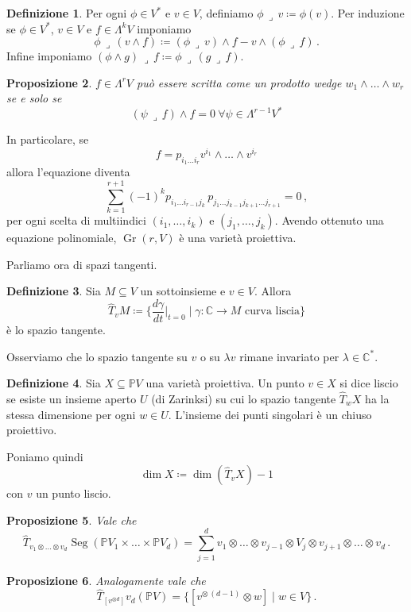 \documentclass[a4paper, 11pt]{article}
\theoremstyle{definition}
\newtheorem{Def}{Definizione}[section]
\theoremstyle{plain}
\newtheorem{Prop}[Def]{Proposizione}
\newcommand{\PP}{\mathbb{P}}
\newcommand{\C}{\mathbb{C}}
\newcommand{\deff}{\coloneqq}
\DeclareMathOperator{\Gr}{Gr}
\DeclareMathOperator{\Seg}{Seg}
\begin{document}
\begin{Def}
	Per ogni $\phi \in V^\ast$ e $v \in V$, definiamo $\phi \,\lrcorner \,v \deff \phi(v)$. Per induzione se $\phi \in V^\ast$, $v \in V$ e $f \in \Lambda^k V$ imponiamo
	\[
		\phi\,\lrcorner\,(v \wedge f) \deff (\phi \,\lrcorner\, v) \wedge f - v \wedge (\phi \,\lrcorner\, f)\,.
	\]
	Infine imponiamo $(\phi \wedge g)\,\lrcorner\, f \deff \phi\,\lrcorner\,(g\, \lrcorner\, f)$.
\end{Def}
\begin{Prop}
	$f \in \Lambda^r V$ può essere scritta come un prodotto wedge $w_1 \wedge\dots\wedge w_r$ se e solo se 
	\[
		(\psi \,\lrcorner\,f) \wedge f = 0\ \forall \psi \in \Lambda^{r-1}V^*
	\]
\end{Prop}
In particolare, se 
\[
	f = p_{i_1\dots i_r}v^{i_1} \wedge \dots \wedge v^{i_r}
\] 
allora l'equazione diventa
\[
	\sum_{k=1}^{r+1}(-1)^kp_{i_1\dots i_{r-1}j_k}\,p_{j_1\dots j_{k-1}j_{k+1}\dots j_{r+1}} = 0\,,
\]
per ogni scelta di multiindici $(i_1, \dots, i_k)$ e $(j_1, \dots, j_k)$. Avendo ottenuto una equazione polinomiale, $\Gr(r,V)$ è una varietà proiettiva.

Parliamo ora di spazi tangenti. 
\begin{Def}
	Sia $M \subseteq V$ un sottoinsieme e $v \in V$. Allora
	\[
		\hat{T}_vM \deff \Big\{\frac{d\gamma}{dt}\Big|_{t = 0} \mid \gamma \colon \C \to M \text{ curva liscia}\Big\}
	\]
	è lo spazio tangente.
\end{Def}
Osserviamo che lo spazio tangente su $v$ o su $\lambda v$ rimane invariato per $\lambda \in \C^*$.

\begin{Def}
	Sia $X \subseteq \PP V$ una varietà proiettiva. Un punto $v \in X$ si dice liscio se esiste un insieme aperto $U$ (di Zarinksi) su cui lo spazio tangente $\hat{T}_w X$ ha la stessa dimensione per ogni $w \in U$. L'insieme dei punti singolari è un chiuso proiettivo.
\end{Def}

Poniamo quindi 
\[
	\dim X \deff \dim (\hat{T}_v X)-1
\]
con $v$ un punto liscio.

\begin{Prop}
	Vale che
	\[
		\hat{T}_{v_1\otimes \dots \otimes v_d} \Seg(\PP V_1 \times \dots \times \PP V_d) = \sum_{j =1}^d
 v_1 \otimes \dots \otimes v_{j-1}\otimes V_j\otimes v_{j+1} \otimes \dots \otimes v_d\,.
 	\]
\end{Prop}
\begin{Prop}
	Analogamente vale che
	\[
		\hat{T}_{[v^{\otimes d}]} v_d(\PP V) = \{[v^{\otimes\, (d-1)}\otimes w] \mid w \in V\}\,.
	\]
\end{Prop}
\end{document}
